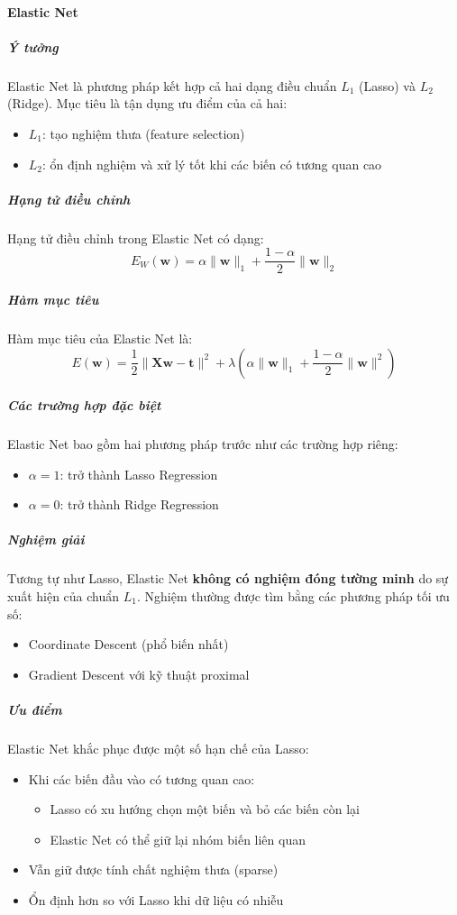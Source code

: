 \paragraph{Elastic Net}

\subparagraph{Ý tưởng}
Elastic Net là phương pháp kết hợp cả hai dạng điều chuẩn $L_1$ (Lasso) và
$L_2$ (Ridge). Mục tiêu là tận dụng ưu điểm của cả hai:
\begin{itemize}
  \item $L_1$: tạo nghiệm thưa (feature selection)
  \item $L_2$: ổn định nghiệm và xử lý tốt khi các biến có tương quan cao
\end{itemize}

\subparagraph{Hạng tử điều chỉnh}
Hạng tử điều chỉnh trong Elastic Net có dạng:
\begin{equation}
  E_W(\boldsymbol{w}) = \alpha \|\boldsymbol{w}\|_1 + \frac{1 - \alpha}{2} \|\boldsymbol{w}\|_2
\end{equation}

\subparagraph{Hàm mục tiêu}
Hàm mục tiêu của Elastic Net là:
\begin{equation}
  E(\boldsymbol{w}) = \frac{1}{2} \|\boldsymbol{X}\boldsymbol{w} -
  \boldsymbol{t}\|^2 + \lambda \left( \alpha \|\boldsymbol{w}\|_1 +
  \frac{1 - \alpha}{2} \|\boldsymbol{w}\|^2 \right)
\end{equation}

\subparagraph{Các trường hợp đặc biệt}
Elastic Net bao gồm hai phương pháp trước như các trường hợp riêng:
\begin{itemize}
  \item $\alpha = 1$: trở thành Lasso Regression
  \item $\alpha = 0$: trở thành Ridge Regression
\end{itemize}

\subparagraph{Nghiệm giải}
Tương tự như Lasso, Elastic Net \textbf{không có nghiệm đóng tường minh} do sự
xuất hiện của chuẩn $L_1$.
Nghiệm thường được tìm bằng các phương pháp tối ưu số:
\begin{itemize}
  \item Coordinate Descent (phổ biến nhất)
  \item Gradient Descent với kỹ thuật proximal
\end{itemize}

\subparagraph{Ưu điểm}
Elastic Net khắc phục được một số hạn chế của Lasso:
\begin{itemize}
  \item Khi các biến đầu vào có tương quan cao:
  \begin{itemize}
    \item Lasso có xu hướng chọn một biến và bỏ các biến còn lại
    \item Elastic Net có thể giữ lại nhóm biến liên quan
  \end{itemize}
  \item Vẫn giữ được tính chất nghiệm thưa (sparse)
  \item Ổn định hơn so với Lasso khi dữ liệu có nhiễu
\end{itemize}

